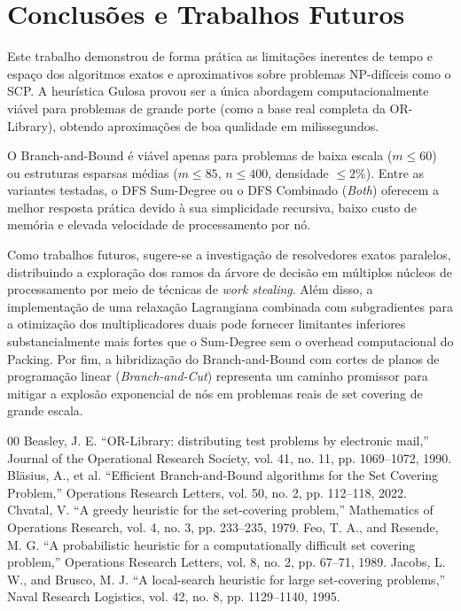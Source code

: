 \documentclass[conference]{IEEEtran}
\begin{document}
\section{Conclusões e Trabalhos Futuros}
Este trabalho demonstrou de forma prática as limitações inerentes de tempo e espaço dos algoritmos exatos e aproximativos sobre problemas NP-difíceis como o SCP. A heurística Gulosa provou ser a única abordagem computacionalmente viável para problemas de grande porte (como a base real completa da OR-Library), obtendo aproximações de boa qualidade em milissegundos. 

O Branch-and-Bound é viável apenas para problemas de baixa escala ($m \le 60$) ou estruturas esparsas médias ($m \le 85$, $n \le 400$, densidade $\le 2\%$). Entre as variantes testadas, o DFS Sum-Degree ou o DFS Combinado (\textit{Both}) oferecem a melhor resposta prática devido à sua simplicidade recursiva, baixo custo de memória e elevada velocidade de processamento por nó.

Como trabalhos futuros, sugere-se a investigação de resolvedores exatos paralelos, distribuindo a exploração dos ramos da árvore de decisão em múltiplos núcleos de processamento por meio de técnicas de \textit{work stealing}. Além disso, a implementação de uma relaxação Lagrangiana combinada com subgradientes para a otimização dos multiplicadores duais pode fornecer limitantes inferiores substancialmente mais fortes que o Sum-Degree sem o overhead computacional do Packing. Por fim, a hibridização do Branch-and-Bound com cortes de planos de programação linear (\textit{Branch-and-Cut}) representa um caminho promissor para mitigar a explosão exponencial de nós em problemas reais de set covering de grande escala.

\begin{thebibliography}{00}
 Beasley, J. E. ``OR-Library: distributing test problems by electronic mail,'' Journal of the Operational Research Society, vol. 41, no. 11, pp. 1069--1072, 1990.
 Bläsius, A., et al. ``Efficient Branch-and-Bound algorithms for the Set Covering Problem,'' Operations Research Letters, vol. 50, no. 2, pp. 112--118, 2022.
 Chvatal, V. ``A greedy heuristic for the set-covering problem,'' Mathematics of Operations Research, vol. 4, no. 3, pp. 233--235, 1979.
 Feo, T. A., and Resende, M. G. ``A probabilistic heuristic for a computationally difficult set covering problem,'' Operations Research Letters, vol. 8, no. 2, pp. 67--71, 1989.
 Jacobs, L. W., and Brusco, M. J. ``A local-search heuristic for large set-covering problems,'' Naval Research Logistics, vol. 42, no. 8, pp. 1129--1140, 1995.
\end{thebibliography}
\end{document}
